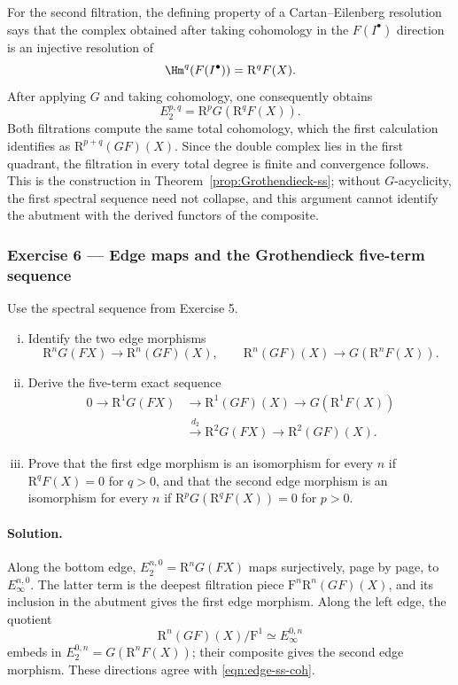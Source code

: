 For the second filtration, the defining property of a Cartan--Eilenberg
resolution says that the complex obtained after taking cohomology in the
$F(I^\bullet)$ direction is an injective resolution of
\[
	\Hm^q(F(I^\bullet))=\mathrm{R}^qF(X).
\]
After applying $G$ and taking cohomology, one consequently obtains
\[
	E_2^{p,q}=\mathrm{R}^pG(\mathrm{R}^qF(X)).
\]
Both filtrations compute the same total cohomology, which the first
calculation identifies as $\mathrm{R}^{p+q}(GF)(X)$. Since the double
complex lies in the first quadrant, the filtration in every total degree is
finite and convergence follows. This is the construction in
Theorem~\ref{prop:Grothendieck-ss}; without $G$-acyclicity, the first
spectral sequence need not collapse, and this argument cannot identify the
abutment with the derived functors of the composite.

\subsubsection*{Exercise 6 --- Edge maps and the Grothendieck five-term sequence}
\hypertarget{o014.mastery.derived-spectral.002.ex06}{ }
\label{mastery:derived-spectral-002-ex06}

Use the spectral sequence from Exercise 5.
\begin{enumerate}[(i)]
	\item Identify the two edge morphisms
	\[
		\mathrm{R}^nG(FX)\longrightarrow\mathrm{R}^n(GF)(X),
		\qquad
		\mathrm{R}^n(GF)(X)\longrightarrow G(\mathrm{R}^nF(X)).
	\]
	\item Derive the five-term exact sequence
	\[
	\begin{aligned}
		0\to\mathrm{R}^1G(FX)&\to\mathrm{R}^1(GF)(X)
		\to G(\mathrm{R}^1F(X))\\
		&\xrightarrow{d_2}\mathrm{R}^2G(FX)
		\to\mathrm{R}^2(GF)(X).
	\end{aligned}
	\]
	\item Prove that the first edge morphism is an isomorphism for every
	$n$ if $\mathrm{R}^qF(X)=0$ for $q>0$, and that the second edge
	morphism is an isomorphism for every $n$ if
	$\mathrm{R}^pG(\mathrm{R}^qF(X))=0$ for $p>0$.
\end{enumerate}

\paragraph{Solution.}
\hypertarget{o014.mastery.derived-spectral.002.sol06}{ }
Along the bottom edge,
$E_2^{n,0}=\mathrm{R}^nG(FX)$ maps surjectively, page by page, to
$E_\infty^{n,0}$. The latter term is the deepest filtration piece
$\mathrm{F}^n\mathrm{R}^n(GF)(X)$, and its inclusion in the abutment gives
the first edge morphism. Along the left edge, the quotient
\[
	\mathrm{R}^n(GF)(X)/\mathrm{F}^1
	\simeq E_\infty^{0,n}
\]
embeds in $E_2^{0,n}=G(\mathrm{R}^nF(X))$; their composite gives the
second edge morphism. These directions agree with
\eqref{eqn:edge-ss-coh}.

